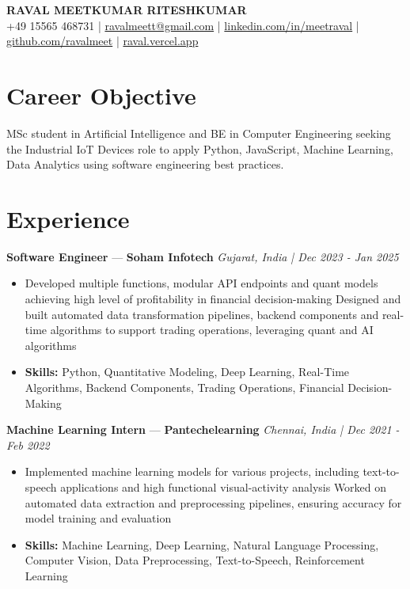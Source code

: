 \documentclass[a4paper,10pt]{article}
\begin{document}
\begin{center}
  {\Large\bfseries RAVAL MEETKUMAR RITESHKUMAR}\\[2pt]
  {\small +49 15565 468731 \;|\; \href{mailto:ravalmeett@gmail.com}{ravalmeett@gmail.com} \;|\; \href{https://www.linkedin.com/in/meetraval/}{linkedin.com/in/meetraval} \;|\; \href{https://github.com/ravalmeet}{github.com/ravalmeet} \;|\; \href{https://raval.vercel.app/}{raval.vercel.app}}
\end{center}
\vspace{-3pt}

\section*{Career Objective}
MSc student in Artificial Intelligence and BE in Computer Engineering seeking the Industrial IoT Devices role to apply Python, JavaScript, Machine Learning, Data Analytics using software engineering best practices.\par

\section*{Experience}
\textbf{Software Engineer} — \textbf{Soham Infotech} \hfill \textit{Gujarat, India \;|\; Dec 2023 - Jan 2025}\par
\vspace{1pt}
\begin{itemize}
  \item Developed multiple functions, modular API endpoints and quant models achieving high level of profitability in financial decision-making Designed and built automated data transformation pipelines, backend components and real-time algorithms to support trading operations, leveraging quant and AI algorithms
  \item \textbf{Skills:} Python, Quantitative Modeling, Deep Learning, Real-Time Algorithms, Backend Components, Trading Operations, Financial Decision-Making
\end{itemize}
\vspace{3pt}
\textbf{Machine Learning Intern} — \textbf{Pantechelearning} \hfill \textit{Chennai, India \;|\; Dec 2021 - Feb 2022}\par
\vspace{1pt}
\begin{itemize}
  \item Implemented machine learning models for various projects, including text-to-speech applications and high functional visual-activity analysis Worked on automated data extraction and preprocessing pipelines, ensuring accuracy for model training and evaluation
  \item \textbf{Skills:} Machine Learning, Deep Learning, Natural Language Processing, Computer Vision, Data Preprocessing, Text-to-Speech, Reinforcement Learning
\end{itemize}
\end{document}
